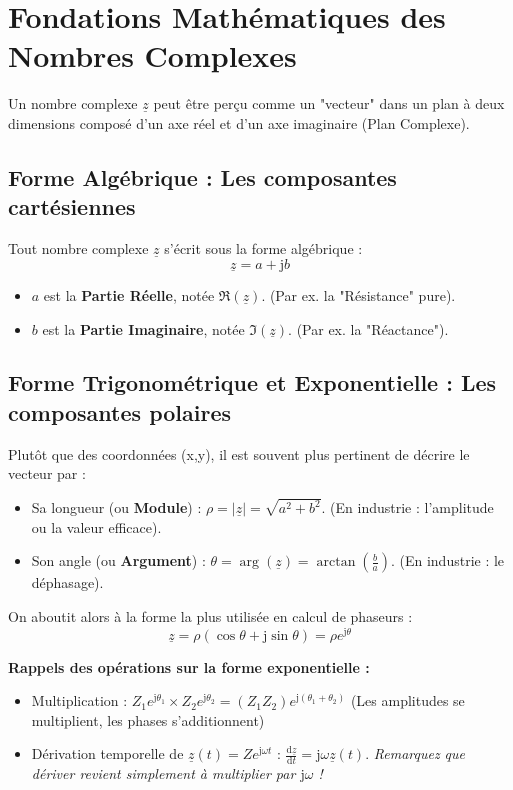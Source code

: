 \documentclass[11pt,a4paper]{article}
\newcommand{\jc}{\mathrm{j}} %
\newcommand{\cpx}[1]{\underline{#1}} %
\newcommand{\deriv}[2]{\frac{\mathrm{d}#1}{\mathrm{d}#2}}
\begin{document}
\section{Fondations Mathématiques des Nombres Complexes}

Un nombre complexe $\cpx{z}$ peut être perçu comme un "vecteur" dans un plan à deux dimensions composé d'un axe réel et d'un axe imaginaire (Plan Complexe).

\subsection{Forme Algébrique : Les composantes cartésiennes}
Tout nombre complexe $\cpx{z}$ s'écrit sous la forme algébrique :
\[ \cpx{z} = a + \jc b \]
\begin{itemize}
    \item $a$ est la \textbf{Partie Réelle}, notée $\Re(\cpx{z})$. (Par ex. la "Résistance" pure).
    \item $b$ est la \textbf{Partie Imaginaire}, notée $\Im(\cpx{z})$. (Par ex. la "Réactance").
\end{itemize}

\subsection{Forme Trigonométrique et Exponentielle : Les composantes polaires}
Plutôt que des coordonnées (x,y), il est souvent plus pertinent de décrire le vecteur par :
\begin{itemize}
    \item Sa longueur (ou \textbf{Module}) : $\rho = |\cpx{z}| = \sqrt{a^2 + b^2}$. (En industrie : l'amplitude ou la valeur efficace).
    \item Son angle (ou \textbf{Argument}) : $\theta = \arg(\cpx{z}) = \arctan(\frac{b}{a})$. (En industrie : le déphasage).
\end{itemize}

On aboutit alors à la forme la plus utilisée en calcul de phaseurs :
\begin{equation}
    \cpx{z} = \rho \left( \cos\theta + \jc \sin\theta \right) = \rho e^{\jc \theta}
\end{equation}

\noindent \textbf{Rappels des opérations sur la forme exponentielle :}
\begin{itemize}
    \item Multiplication : $Z_1 e^{\jc \theta_1} \times Z_2 e^{\jc \theta_2} = (Z_1 Z_2) e^{\jc (\theta_1 + \theta_2)}$ (Les amplitudes se multiplient, les phases s'additionnent)
    \item Dérivation temporelle de $\cpx{z}(t) = Z e^{\jc \omega t}$ : $\deriv{\cpx{z}}{t} = \jc \omega \cpx{z}(t)$. \textit{Remarquez que dériver revient simplement à multiplier par $\jc\omega$ !}
\end{itemize}
\end{document}
